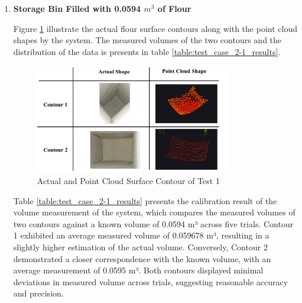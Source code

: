 \begin{enumerate}
	\item \textbf{Storage Bin Filled with 0.0594 $m^3$ of Flour}

	      Figure \ref{ch4:fig:test_2-1_contours} illustrate the actual flour surface contours along with the point cloud shapes by the system. The measured volumes of the two contours and the distribution of the data is presents in table \ref{table:test_case_2-1_results}. %
	      \\
	      \begin{figure}[H]
		      \centering
		      \includegraphics[width=0.8\textwidth]{Figures/test_2-1_contours}
		      \caption{Actual and Point Cloud Surface Contour of Test 1}
		      \label{ch4:fig:test_2-1_contours}
	      \end{figure}

	      Table \ref{table:test_case_2-1_results} presents the calibration result of the volume measurement of the system, which compares the measured volumes of two contours against a known volume of 0.0594 m³ across five trials. Contour 1 exhibited an average measured volume of 0.059678 m³, resulting in a slightly higher estimation of the actual volume. Conversely, Contour 2 demonstrated a closer correspondence with the known volume, with an average measurement of 0.0595 m³. Both contours displayed minimal deviations in measured volume across trials, suggesting reasonable accuracy and precision. \\


\end{enumerate}
